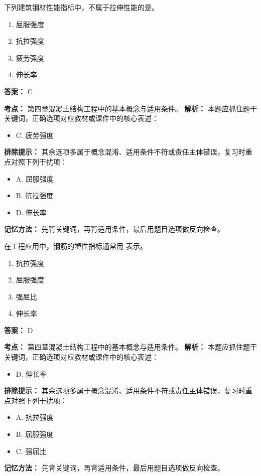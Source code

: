 \documentclass[UTF8,fontset=fandol,11pt]{ctexart}
\begin{document}
\begin{quizbox}[title={第 7 题}]
下列建筑钢材性能指标中，不属于拉伸性能的是。\\
\begin{enumerate}[label=\Alph*.]
\item 屈服强度
\item 抗拉强度
\item 疲劳强度
\item 伸长率
\end{enumerate}
\textbf{答案：} C
\vspace{0.25em}
\begin{answerbox}[title={考点解析}]
\textbf{考点：} 第四章混凝土结构工程中的基本概念与适用条件。
\textbf{解析：} 本题应抓住题干关键词，正确选项对应教材或课件中的核心表述：
\begin{itemize}
\item C. 疲劳强度
\end{itemize}
\textbf{排除提示：} 其余选项多属于概念混淆、适用条件不符或责任主体错误，复习时重点对照下列干扰项：
\begin{itemize}
\item A. 屈服强度
\item B. 抗拉强度
\item D. 伸长率
\end{itemize}
\textbf{记忆方法：} 先背关键词，再背适用条件，最后用题目选项做反向检查。
\end{answerbox}
\end{quizbox}

\vspace{0.2em}

\begin{quizbox}[title={第 8 题}]
在工程应用中，钢筋的塑性指标通常用 表示。\\
\begin{enumerate}[label=\Alph*.]
\item 抗拉强度
\item 屈服强度
\item 强屈比
\item 伸长率
\end{enumerate}
\textbf{答案：} D
\vspace{0.25em}
\begin{answerbox}[title={考点解析}]
\textbf{考点：} 第四章混凝土结构工程中的基本概念与适用条件。
\textbf{解析：} 本题应抓住题干关键词，正确选项对应教材或课件中的核心表述：
\begin{itemize}
\item D. 伸长率
\end{itemize}
\textbf{排除提示：} 其余选项多属于概念混淆、适用条件不符或责任主体错误，复习时重点对照下列干扰项：
\begin{itemize}
\item A. 抗拉强度
\item B. 屈服强度
\item C. 强屈比
\end{itemize}
\textbf{记忆方法：} 先背关键词，再背适用条件，最后用题目选项做反向检查。
\end{answerbox}
\end{quizbox}
\end{document}
